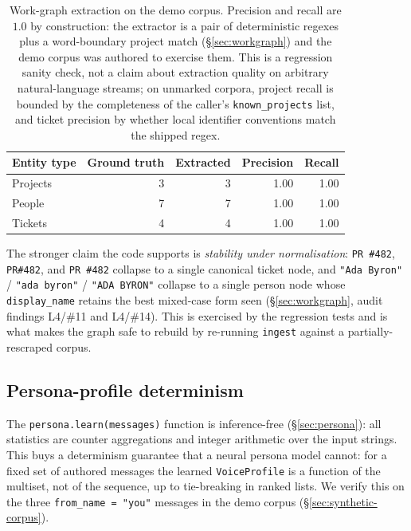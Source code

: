 \begin{table}[h]
\centering
\small
\begin{tabular}{lrrrr}
\toprule
\textbf{Entity type} & \textbf{Ground truth} & \textbf{Extracted} & \textbf{Precision} & \textbf{Recall} \\
\midrule
Projects & 3 & 3 & 1.00 & 1.00 \\
People   & 7 & 7 & 1.00 & 1.00 \\
Tickets  & 4 & 4 & 1.00 & 1.00 \\
\bottomrule
\end{tabular}
\caption{Work-graph extraction on the demo corpus. Precision and recall are
$1.0$ by construction: the extractor is a pair of deterministic regexes plus
a word-boundary project match (\S\ref{sec:workgraph}) and the demo corpus was
authored to exercise them. This is a regression sanity check, not a claim
about extraction quality on arbitrary natural-language streams; on unmarked
corpora, project recall is bounded by the completeness of the caller's
\texttt{known\_projects} list, and ticket precision by whether local
identifier conventions match the shipped regex.}
\label{tab:workgraph-truth}
\end{table}

The stronger claim the code supports is \emph{stability under normalisation}:
\texttt{PR \#482}, \texttt{PR\#482}, and \texttt{PR  \#482} collapse to a single
canonical ticket node, and \texttt{"Ada Byron"} / \texttt{"ada byron"} /
\texttt{"ADA BYRON"} collapse to a single person node whose \texttt{display\_name}
retains the best mixed-case form seen (\S\ref{sec:workgraph}, audit findings
L4/\#11 and L4/\#14). This is exercised by the regression tests and is what
makes the graph safe to rebuild by re-running \texttt{ingest} against a
partially-rescraped corpus.

\subsection{Persona-profile determinism}
\label{sec:eval-persona-det}

The \texttt{persona.learn(messages)} function is inference-free
(\S\ref{sec:persona}): all statistics are counter aggregations and integer
arithmetic over the input strings. This buys a determinism guarantee that a
neural persona model cannot: for a fixed set of authored messages the learned
\texttt{VoiceProfile} is a function of the multiset, not of the sequence, up to
tie-breaking in ranked lists. We verify this on the three \texttt{from\_name =
"you"} messages in the demo corpus (\S\ref{sec:synthetic-corpus}).

